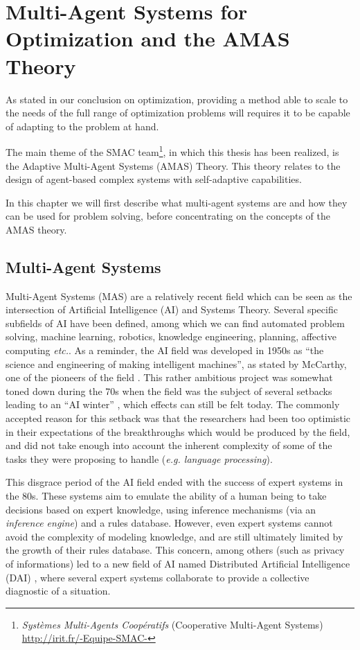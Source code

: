 \chapter{Multi-Agent Systems for Optimization and the AMAS Theory}\label{AMAS_chapter}

As stated in our conclusion on optimization, providing a method able to scale to the needs of the full range of optimization problems will requires it to be capable of adapting to the problem at hand.

The main theme of the SMAC team\footnote{\emph{Systèmes Multi-Agents Coopératifs} (Cooperative Multi-Agent Systems)\\\url{http://irit.fr/-Equipe-SMAC-}}, in which this thesis has been realized, is the Adaptive Multi-Agent Systems (AMAS) Theory. This theory relates to the design of agent-based complex systems with self-adaptive capabilities.

In this chapter we will first describe what multi-agent systems are and how they can be used for problem solving, before concentrating on the concepts of the AMAS theory.

\section{Multi-Agent Systems}

Multi-Agent Systems (MAS) are a relatively recent field which can be seen as the intersection of Artificial Intelligence (AI) and Systems Theory. Several specific subfields of AI have been defined, among which we can find automated problem solving, machine learning, robotics, knowledge engineering, planning, affective computing \emph{etc.}. As a reminder, the AI field was developed in 1950s as \enquote{the science and engineering of making intelligent machines}, as stated by McCarthy, one of the pioneers of the field \cite{mccarthy2006proposal}. This rather ambitious project was somewhat toned down during the 70s when the field was the subject of several setbacks leading to an \enquote{AI winter} \cite{10.1109/MIS.2008.20}, which effects can still be felt today. The commonly accepted reason for this setback was that the researchers had been too optimistic in their expectations of the breakthroughs which would be produced by the field, and did not take enough into account the inherent complexity of some of the tasks they were proposing to handle (\emph{e.g. language processing}).

This disgrace period of the AI field ended with the success of expert systems in the 80s. These systems aim to emulate the ability of a human being to take decisions based on expert knowledge, using inference mechanisms (via an \emph{inference engine}) and a rules database.
However, even expert systems cannot avoid the complexity of modeling knowledge, and are still ultimately limited by the growth of their rules database. This concern, among others (such as privacy of informations) led to a new field of AI named Distributed Artificial Intelligence (DAI) \cite{o1996foundations}, where several expert systems collaborate to provide a collective diagnostic of a situation.

